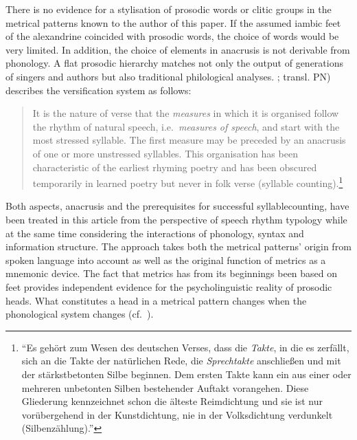 \documentclass[output=paper
  ,nobabel
  ,uniformtopskip %
]{langscibook}
\begin{document}
There is no evidence for a stylisation of prosodic words or clitic groups in the  metrical patterns known to the author of this paper. If the assumed iambic feet of the  alexandrine coincided with prosodic words, the choice of words would be very limited. In addition, the choice of elements in anacrusis is not derivable from phonology. A flat prosodic hierarchy matches not only the output of generations of singers and authors but also traditional philological analyses. \citet[§16]{Paul1905}; transl. PN) describes the  versification system as follows:
\begin{quote}
It is the nature of  verse that the \emph{measures} in which it is organised follow the rhythm of natural speech, i.e.\ \emph{measures of speech}, and start with the most stressed syllable. The first measure may be preceded by an anacrusis of one or more unstressed syllables. This organisation has been characteristic of the earliest rhyming poetry and has been obscured temporarily in learned poetry but never in folk verse (syllable counting).\footnote{``Es gehört zum Wesen des deutschen Verses, dass die \emph{Takte}, in die es zerfällt, sich an die Takte der natürlichen Rede, die \emph{Sprechtakte} anschließen und mit der stärkstbetonten Silbe beginnen. Dem ersten Takte kann ein aus einer oder mehreren unbetonten Silben bestehender Auftakt vorangehen. Diese Gliederung kennzeichnet schon die älteste Reimdichtung und sie ist nur vorübergehend in der Kunstdichtung, nie in der Volksdichtung verdunkelt (Silbenzählung).''}
\end{quote}

\noindent
Both aspects, anacrusis and the  prerequisites for successful syllable\linebreak counting, have been treated in this article from the perspective of speech rhythm typology while at the same time considering the interactions of phonology, syntax and information structure. The approach takes both the metrical patterns' origin from spoken language into account as well as the original function of metrics as a mnemonic device. The fact that  metrics has from its beginnings been based on feet provides independent evidence for the psycholinguistic reality of prosodic heads. What constitutes a head in a metrical pattern changes when the phonological system changes (cf.\ \eg \citealp{Vennemann1995,NoelAzizHanna2008a}).
\end{document}
